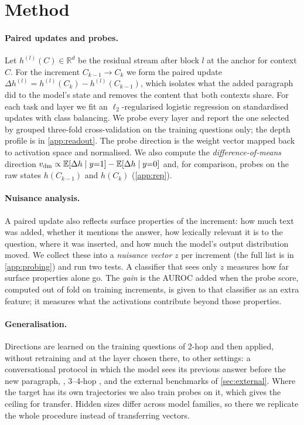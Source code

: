 \section{Method}
\label{sec:method}

\paragraph{Paired updates and probes.}
Let $h^{(l)}(C)\in\mathbb R^{d}$ be the residual stream after block $l$ at the anchor for context $C$. For the increment $C_{k-1}\to C_k$ we form the paired update $\Delta h^{(l)}=h^{(l)}(C_k)-h^{(l)}(C_{k-1})$, which isolates what the added paragraph did to the model's state and removes the content that both contexts share. For each task and layer we fit an $\ell_2$-regularised logistic regression on standardised updates with class balancing. We probe every layer and report the one selected by grouped three-fold cross-validation on the training questions only; the depth profile is in \cref{app:readout}. The probe direction is the weight vector mapped back to activation space and normalised. We also compute the \emph{difference-of-means} direction $v_{\mathrm{dm}}\propto\mathbb E[\Delta h\mid y{=}1]-\mathbb E[\Delta h\mid y{=}0]$ and, for comparison, probes on the raw states $h(C_{k-1})$ and $h(C_k)$ (\cref{app:rep}).

\paragraph{Nuisance analysis.}
A paired update also reflects surface properties of the increment: how much text was added, whether it mentions the answer, how lexically relevant it is to the question, where it was inserted, and how much the model's output distribution moved. We collect these into a \emph{nuisance vector} $z$ per increment (the full list is in \cref{app:probing}) and run two tests. A classifier that sees only $z$ measures how far surface properties alone go. The \emph{gain} is the AUROC added when the probe score, computed out of fold on training increments, is given to that classifier as an extra feature; it measures what the activations contribute beyond those properties.

\paragraph{Generalisation.}
Directions are learned on the training questions of 2-hop \musique{} and then applied, without retraining and at the layer chosen there, to other settings: a conversational protocol in which the model sees its previous answer before the new paragraph, \twowiki{}, 3--4-hop \musique{}, and the external benchmarks of \cref{sec:external}. Where the target has its own trajectories we also train probes on it, which gives the ceiling for transfer. Hidden sizes differ across model families, so there we replicate the whole procedure instead of transferring vectors.

